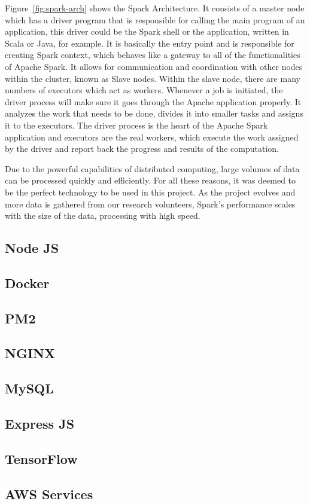 Figure~\ref{fig:spark-arch} shows the Spark Architecture. It consists of a master node which has a driver program that is responsible for calling the main program of an application, this driver could be the Spark shell or the application, written in Scala or Java, for example. It is basically the entry point and is responsible for creating Spark context, which behaves like a gateway to all of the functionalities of Apache Spark. It allows for communication and coordination with other nodes within the cluster, known as Slave nodes. Within the slave node, there are many numbers of executors which act as workers. Whenever a job is initiated, the driver process will make sure it goes through the Apache application properly. It analyzes the work that needs to be done, divides it into smaller tasks and assigns it to the executors. The driver process is the heart of the Apache Spark application and executors are the real workers, which execute the work assigned by the driver and report back the progress and results of the computation.\cite{8988541}

Due to the powerful capabilities of distributed computing, large volumes of data can be processed quickly and efficiently. For all these reasons, it was deemed to be the perfect technology to be used in this project. As the project evolves and more data is gathered from our research volunteers, Spark's performance scales with the size of the data, processing with high speed.


\subsection{Node JS}

\subsection{Docker}

\subsection{PM2}

\subsection{NGINX}

\subsection{MySQL}

\subsection{Express JS}

\subsection{TensorFlow}

\subsection{AWS Services}

